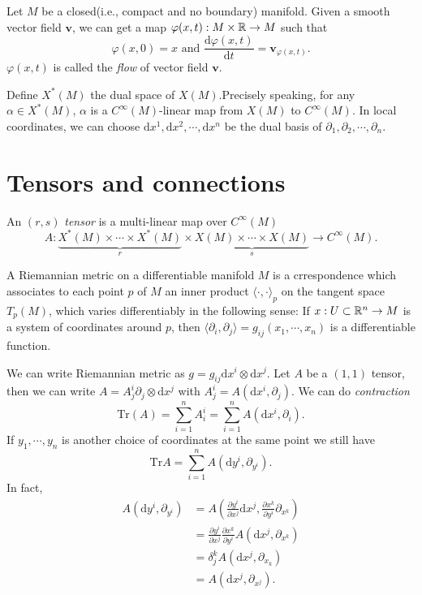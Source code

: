 \begin{definition}
  Let $M$ be a closed(i.e., compact and no boundary) manifold. Given a smooth vector field $\mathbf{v}$, we can get a map $\varphi(x,t):M\times \mathbb{R}\to M$ such that 
  \[
    \varphi(x,0)=x \text{ and } \frac{\mathrm{d}\varphi(x,t)}{\mathrm{d}t}=\mathbf{v}_{\varphi(x,t)}.
  \] 
  $\varphi(x,t)$ is called the \textit{flow} of vector field $\mathbf{v}$.
\end{definition}

\begin{definition}
  Define $X^*(M)$ the dual space of  $X(M)$.Precisely speaking, for any $\alpha\in X^*(M)$, $\alpha$ is a $C^\infty(M)$-linear map from $X(M)$ to $C^{\infty}(M)$. In local coordinates, we can choose  $\mathrm{d}x^1,\mathrm{d}x^2,\cdots ,\mathrm{d}x^n$ be the dual basis of $\partial_1,\partial_2,\cdots ,\partial_n$.
\end{definition}
\section{Tensors and connections}

\begin{definition}
  An $(r,s)$ \textit{tensor} is a multi-linear map over $C^\infty(M)$
   \[
     A: \underbrace{X^*(M)\times \cdots \times X^*(M)}_{r}\times \underbrace{X(M)\times \cdots \times X(M)}_{s}\to C^\infty(M).
  \] 
\end{definition}
\begin{definition}
  A Riemannian metric  on a differentiable manifold $M$ is a crrespondence which associates to each point $p$ of $M$ an inner product $\langle \cdot ,\cdot \rangle_p$ on the tangent space $T_p(M)$, which varies differentiably in the following sense:  If $x:U\subset \mathbb{R}^n\to M$ is a system of coordinates around $p$, then $\langle \partial_i,\partial_j\rangle =g_{ij}(x_1,\cdots ,x_n)$ is a differentiable function.
\end{definition}
We can write Riemannian metric as $g=g_{ij}\mathrm{d}x^i\otimes\mathrm{d}x^j$. Let $A$ be a $(1,1)$ tensor, then we can write $A=A^i_j \partial_j\otimes \mathrm{d}x^j$ with $A^i_j=A(\mathrm{d}x^i,\partial_j)$. We can do \textit{contraction} 
\[
  \mathrm{Tr}(A)=\sum_{i=1}^{n} A^i_i=\sum_{i=1}^{n} A(\mathrm{d}x^i,\partial_i).
\]
If $y_1,\cdots ,y_n$ is another choice of coordinates at the same point we still have
\[
  \mathrm{Tr}A=\sum_{i=1}^{n} A(\mathrm{d}y^i,\partial_{y^i}).
\] 
In fact,
\begin{align*}
  A(\mathrm{d}y^i,\partial_{y^i})&= A\left( \frac{\partial y^i}{\partial x^j}\mathrm{d}x^j, \frac{\partial x^k}{\partial y^i}\partial_{x^k} \right)\\
  &= \frac{\partial y^i}{\partial x^j}\frac{\partial x^k}{\partial y^i}A\left( \mathrm{d}x^j,\partial_{x^k} \right)\\
  &=\delta_j^k A\left( \mathrm{d}x^j,\partial_{x_k} \right) \\
  &=A\left( \mathrm{d}x^j,\partial_{x^j} \right) 
.\end{align*}

